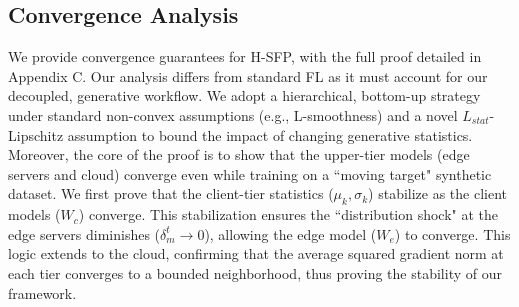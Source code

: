     \subsection{Convergence Analysis}
        We provide convergence guarantees for H-SFP, with the full proof detailed in Appendix C. Our analysis differs from standard FL as it must account for our decoupled, generative workflow. We adopt a hierarchical, bottom-up strategy under standard non-convex assumptions (e.g., L-smoothness) and a novel $L_{stat}$-Lipschitz assumption to bound the impact of changing generative statistics. Moreover, the core of the proof is to show that the upper-tier models (edge servers and cloud) converge even while training on a ``moving target" synthetic dataset. We first prove that the client-tier statistics ($\mu_k, \sigma_k$) stabilize as the client models ($W_c$) converge. This stabilization ensures the ``distribution shock" at the edge servers diminishes ($\delta_m^t \rightarrow 0$), allowing the edge model ($W_e$) to converge. This logic extends to the cloud, confirming that the average squared gradient norm at each tier converges to a bounded neighborhood, thus proving the stability of our framework.